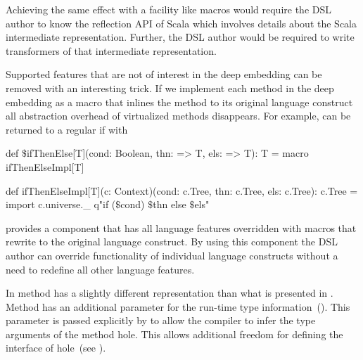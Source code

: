Achieving the same effect with a facility like macros would require the DSL author to know the
reflection API of Scala which involves details about the Scala intermediate representation.
Further, the DSL author would be required to write transformers of that intermediate representation.

Supported features that are not of interest in the deep embedding
 can be removed with an interesting trick. If we implement each method in the deep embedding as a macro
 that inlines the method to its original language construct all abstraction overhead of virtualized methods
 disappears. For example,  can be returned to a regular if with\begin{lstparagraph}
def $\$$ifThenElse[T](cond: Boolean, thn: => T, els: => T): T =
  macro ifThenElseImpl[T]

def ifThenElseImpl[T](c: Context)(cond: c.Tree,
  thn: c.Tree, els: c.Tree): c.Tree = { import c.universe._
  q"if ($\$$cond) $\$$thn else $\$$els"
}
\end{lstparagraph}

\yy provides a component that has all language features overridden with macros that rewrite
to the original language construct. By using this component the DSL author can override functionality
of individual language constructs without a need to redefine all other language features.

In  method  has a slightly different  representation than what is presented in . Method 
 has an additional parameter for the run-time type information~().
 This parameter is passed explicitly by \yy to allow the compiler to infer the type arguments
 of the method hole. This allows additional freedom for defining the interface of hole~(see ).


